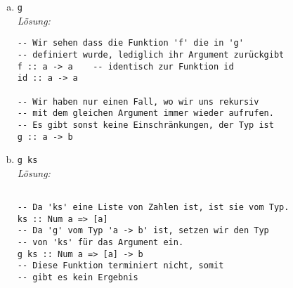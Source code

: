 \documentclass{article}
\begin{document}
\begin{enumerate} [a)]
\begin{mdframed}[backgroundcolor=bg]
\begin{verbatim}
f pred 0 [5,7]    -- Erster Fall von 'f',
                  -- Liste ist nicht leer

=> if pred 5     -- (5 < 0) => False
      then f (not . pred) 0 [7]
      else f (pred) 0 [7]

f pred 0 [7]      -- Erster Fall von 'f',
                  -- Liste ist nicht leer

=> if pred 7      -- (7 < 0) => False
       then f (not . pred) 0 []
       else f (pred) 0 []

f pred 0 []       -- Zweiter Fall von 'f',
                  -- da Liste leer Z.8

=> pred 0 => 0 < 0 => False
        \end{verbatim}
    \end{mdframed}

\newpage

    \item \texttt{g} \\[2mm]
    \textit{Lösung:}
    \begin{mdframed}[backgroundcolor=bg]
        \begin{verbatim}
-- Wir sehen dass die Funktion 'f' die in 'g'
-- definiert wurde, lediglich ihr Argument zurückgibt
f :: a -> a    -- identisch zur Funktion id
id :: a -> a

-- Wir haben nur einen Fall, wo wir uns rekursiv
-- mit dem gleichen Argument immer wieder aufrufen.
-- Es gibt sonst keine Einschränkungen, der Typ ist
g :: a -> b
        \end{verbatim}
    \end{mdframed}

    \item \texttt{g ks} \\[2mm]
    \textit{Lösung:}
    \begin{mdframed}[backgroundcolor=bg]
        \begin{verbatim}

-- Da 'ks' eine Liste von Zahlen ist, ist sie vom Typ.
ks :: Num a => [a]
-- Da 'g' vom Typ 'a -> b' ist, setzen wir den Typ
-- von 'ks' für das Argument ein.
g ks :: Num a => [a] -> b
-- Diese Funktion terminiert nicht, somit
-- gibt es kein Ergebnis
        \end{verbatim}
    \end{mdframed}
\end{enumerate}
\end{document}
